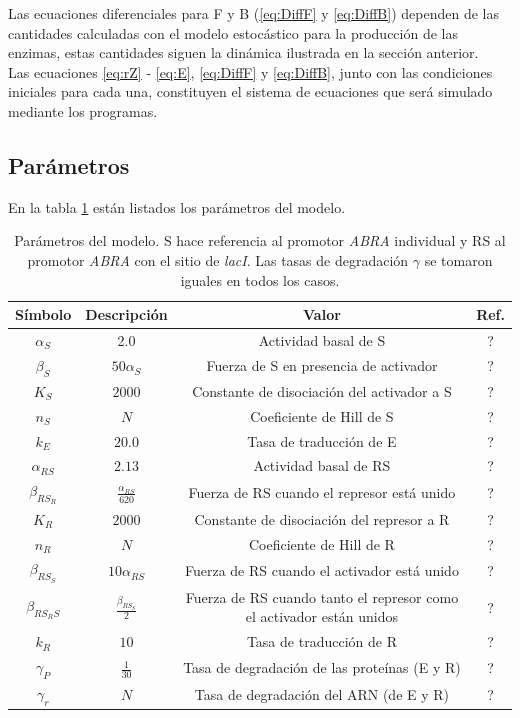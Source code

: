 \documentclass[12pt]{article}
\begin{document}
Las ecuaciones diferenciales para F y B (\ref{eq:DiffF} y \ref{eq:DiffB}) dependen de las cantidades calculadas con el modelo estoc\'astico para la producci\'on de las enzimas, estas cantidades siguen la din\'amica ilustrada en la secci\'on anterior.\\

Las ecuaciones \ref{eq:rZ} - \ref{eq:E}, \ref{eq:DiffF} y \ref{eq:DiffB}, junto con las condiciones iniciales para cada una, constituyen el sistema de ecuaciones que ser\'a simulado mediante los programas.

\subsection{Par\'ametros}

En la tabla \ref{tab:1} est\'an listados los par\'ametros del modelo.

\begin{table}[H]
\centering
\begin{tabular}{c c c c} 
 \hline
 S\'imbolo & Descripci\'on & Valor & Ref. \\
 \hline\hline
 $\alpha_S$ & 2.0 & Actividad basal de S & ? \\ 
 $\beta_S$ & $50\alpha_S$ & Fuerza de S en presencia de activador & ? \\
 $K_S$ & $2000$ & Constante de disociaci\'on del activador a S & ? \\
 $n_S$ & $N$ & Coeficiente de Hill de S & ?\\
 $k_E$ & $20.0$ & Tasa de traducci\'on de E & ?\\
 $\alpha_{RS}$ & $2.13$ & Actividad basal de RS & ?\\
 $\beta_{RS_R}$ & $\frac{\alpha_{RS}}{620}$ & Fuerza de RS cuando el represor est\'a unido & ?\\
 $K_R$ & $2000$ & Constante de disociaci\'on del represor a R & ?\\
 $n_R$ & $N$ & Coeficiente de Hill de R & ?\\
 $\beta_{RS_S}$ & $10\alpha_{RS}$ & Fuerza de RS cuando el activador est\'a unido & ?\\
 $\beta_{RS_RS}$ & $\frac{\beta_{RS_S}}{2}$ & Fuerza de RS cuando tanto el represor como el activador est\'an unidos & ?\\
 $k_R$ & $10$ & Tasa de traducci\'on de R & ?\\
 $\gamma_P$ & $\frac{1}{30}$ & Tasa de degradaci\'on de las prote\'inas (E y R) & ?\\
 $\gamma_r$ & $N$ & Tasa de degradaci\'on del ARN (de E y R) & ?\\
 \hline
\end{tabular}
\caption{Par\'ametros del modelo. S hace referencia al promotor \emph{ABRA} individual y RS al promotor \emph{ABRA} con el sitio de \emph{lacI}. Las tasas de degradaci\'on $\gamma$ se tomaron iguales en todos los casos.}
\label{tab:1}
\end{table}
\end{document}
